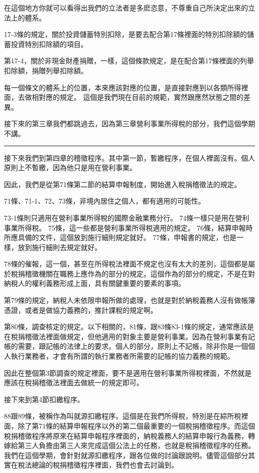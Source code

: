 \documentclass[oneside,sub3section]{ctexbook}
\begin{document}
在這個地方你就可以看得出我們的立法者是多麽恣意，不尊重自己所決定出來的立法上的體系。

17-3條的規定，關於投資儲蓄特別扣除，是要去配合第17條裡面的特別扣除額的儲蓄投資特別扣除額的項目。

第17-4，關於非現金財產捐贈，一樣，這個條款規定，是在配合第17條裡面的列舉扣除額，捐贈列舉扣除額。

每一個條文的體系上的位置，本來應該對應的位置，是直接對應到以各類所得裡面，去做相對應的規定。
這個是我們現在目前的規範，實然跟應然狀態之間的差異。

接下來的第三章我們都跳過去，因為第三章營利事業所得稅的部分，我們這個學期不講。

\begin{center}\rule{0.5\linewidth}{0.5pt}\end{center}

接下來我們到第四章的稽徵程序。其中第一節，暫繳程序，在個人裡面沒有。個人原則上不暫繳，因為他只是用在營利事業。

因此，我們是從第71條第二節的結算申報制度，開始進入稅捐稽徵法的規定。

71條、71-1、72、73條，非境內居住之個人，都有適用的可能性。

73-1條則只適用在營利事業所得稅的國際金融業務分行。
74條一樣只是用在營利事業所得稅。
75條，這一些都是營利事業所得稅適用的規定。
76條，結算申報時所應具備的文件，這個放到施行細則規定就好。
77條，申報書的規定，也是一樣，放到施行細則去規定就好。

78條的催報，這一個，甚至在所得稅法裡面不規定也沒有太大的差別，這個都是屬於稅捐稽徵機關在職務上應作為的部分的規定。這個作為的部分的規定，不是在對納稅人的權利義務形成上面，具有關鍵重要的要素的事項。

第79條的規定，納稅人未依限申報所做的處理，也就是對於納稅義務人沒有做帳簿憑證，或者是做協力義務的，推計課稅的規定啊。

第80條，調查核定的規定。以下相關的，81條，跟83條83-1條的規定，通常應該是在稅捐稽徵法裡面做規定，但他適用的對象主要是營利事業。因為在營利事業有記帳的需要，跟記帳的法律上的要求。個人的部分，原則上不記帳，除非你是一個個人執行業務者，才會有所謂的執行業務者所需要的記帳的協力義務的規範。

因此在整個第3節調查的規定裡面，要不是適用在營利事業所得稅裡面，不然就是應該在稅捐稽徵法裡面去做統一的規定即可。

接下來到第4節扣繳程序。

88跟89條，被稱作為叫就源扣繳程序。這個是在我們所得稅，特別是在綜所稅裡面，除了第71條的結算申報程序以外的第二個最重要的一個稅捐稽徵程序。而這個稅捐稽徵程序將原來在結算申報程序裡面的，納稅義務人的結算申報行為義務，轉嫁給第三人負擔由第三人來完成這個公法上的任務，也就是稅捐稽徵程序的任務。
我們在這個學期，會針對就源扣繳程序，跟各位做的討論跟說明。儘管這個部分其實在稅法總論的稅捐稽徵程序裡面，我們也會去討論到。
\end{document}
